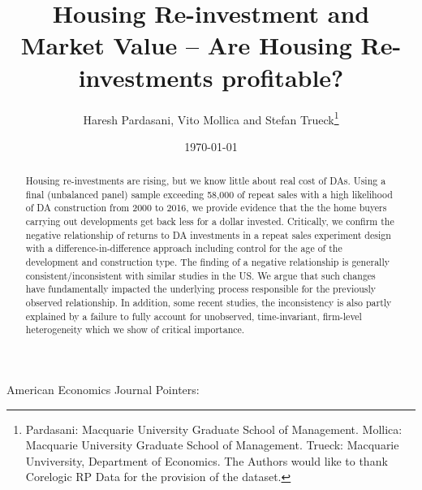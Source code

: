 \documentclass[AEJ]{AEA}
\begin{document}
\title{Housing Re-investment and Market Value -- Are Housing Re-investments profitable?}
\author{Haresh Pardasani, Vito Mollica and Stefan Trueck\thanks{%
Pardasani: Macquarie University Graduate School of Management. Mollica: Macquarie University Graduate School of Management. Trueck: Macquarie Unviversity, Department of Economics. The Authors would like to thank Corelogic RP Data for the provision of the dataset.}}
\date{\today}

\begin{abstract}
Housing re-investments are rising, but we know little about real cost of DAs. Using a final (unbalanced panel) sample exceeding 58,000 of repeat sales with a high likelihood of DA construction from 2000 to 2016, we provide evidence that the the home buyers carrying out developments get back less for a dollar invested. Critically, we confirm the negative relationship of returns to DA investments in a repeat sales experiment design with a difference-in-difference approach including control for the age of the development and construction type. The finding of a negative relationship is generally consistent/inconsistent with similar studies in the US. We argue that such changes have fundamentally impacted the underlying process responsible for the previously observed relationship. In addition, some recent studies, the inconsistency is also partly explained by a failure to fully account for unobserved, time-invariant, firm-level heterogeneity which we show of critical importance.\\

\end{abstract}

\maketitle American Economics Journal Pointers:
\end{document}
